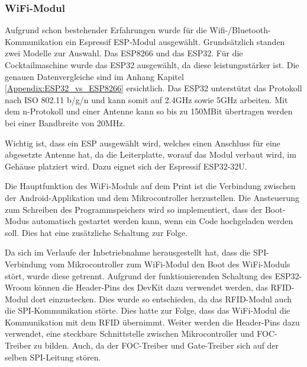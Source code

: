 \newpage
\subsubsection{WiFi-Modul}
\label{subsubsec:ESP}

Aufgrund schon bestehender Erfahrungen wurde für die Wifi-/Bluetooth-Kommunikation ein Espressif ESP-Modul ausgewählt. Grundsätzlich standen zwei Modelle zur Auswahl. Das ESP8266 und das ESP32. Für die Cocktailmaschine wurde das ESP32 ausgewählt, da diese leistungsstärker ist. Die genauen Datenvergleiche sind im Anhang Kapitel \ref{Appendix:ESP32_vs_ESP8266} ersichtlich. Das ESP32 unterstützt das Protokoll nach ISO 802.11 b/g/n und kann somit auf 2.4GHz sowie 5GHz arbeiten. Mit dem n-Protokoll und einer Antenne kann so bis zu 150MBit übertragen werden bei einer Bandbreite von 20MHz.

Wichtig ist, dass ein ESP ausgewählt wird, welches einen Anschluss für eine abgesetzte Antenne hat, da die Leiterplatte, worauf das Modul verbaut wird, im Gehäuse platziert wird. Dazu eignet sich der Espressif ESP32-32U.

Die Hauptfunktion des WiFi-Moduls auf dem Print ist die Verbindung  zwischen der Android-Applikation und dem Mikrocontroller herzustellen. Die Ansteuerung zum Schreiben des Programmspeichers wird so implementiert, dass der Boot-Modus automatisch gestartet werden kann, wenn ein Code hochgeladen werden soll. Dies hat eine zusätzliche Schaltung zur Folge.

Da sich im Verlaufe der Inbetriebnahme herausgestellt hat, dass die SPI-Verbindung vom Mikrocontroller zum WiFi-Modul den Boot des WiFi-Moduls stört, wurde diese getrennt. Aufgrund der funktionierenden Schaltung des ESP32-Wroom können die Header-Pins des DevKit dazu verwendet werden, das RFID-Modul dort einzustecken. Dies wurde so entschieden, da das RFID-Modul auch die SPI-Kommunikation störte. Dies hatte zur Folge, dass das WiFi-Modul die Kommunikation mit dem RFID übernimmt. Weiter werden die Header-Pins dazu verwendet, eine steckbare Schnittstelle zwischen Mikrocontroller und FOC-Treiber zu bilden. Auch, da der FOC-Treiber und Gate-Treiber sich auf der selben SPI-Leitung stören.

%

